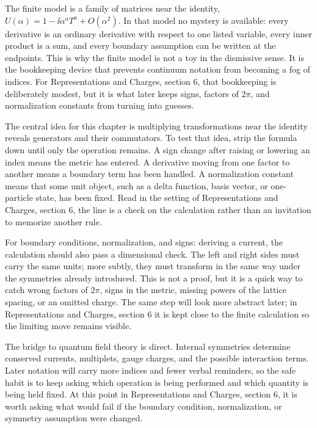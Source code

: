 The finite model is a family of matrices near the identity, \(U(\alpha)=1-\ii\alpha^aT^a+O(\alpha^2)\).  In that model no mystery is available: every derivative is an ordinary derivative with respect to one listed variable, every inner product is a sum, and every boundary assumption can be written at the endpoints.  This is why the finite model is not a toy in the dismissive sense.  It is the bookkeeping device that prevents continuum notation from becoming a fog of indices.  For Representations and Charges, section 6, that bookkeeping is deliberately modest, but it is what later keeps signs, factors of \(2\pi\), and normalization constants from turning into guesses.

The central idea for this chapter is multiplying transformations near the identity reveals generators and their commutators.  To test that idea, strip the formula down until only the operation remains.  A sign change after raising or lowering an index means the metric has entered.  A derivative moving from one factor to another means a boundary term has been handled.  A normalization constant means that some unit object, such as a delta function, basis vector, or one-particle state, has been fixed.  Read in the setting of Representations and Charges, section 6, the line is a check on the calculation rather than an invitation to memorize another rule.

For boundary conditions, normalization, and signs: deriving a current, the calculation should also pass a dimensional check.  The left and right sides must carry the same units; more subtly, they must transform in the same way under the symmetries already introduced.  This is not a proof, but it is a quick way to catch wrong factors of \(2\pi\), signs in the metric, missing powers of the lattice spacing, or an omitted charge.  The same step will look more abstract later; in Representations and Charges, section 6 it is kept close to the finite calculation so the limiting move remains visible.

The bridge to quantum field theory is direct.  Internal symmetries determine conserved currents, multiplets, gauge charges, and the possible interaction terms.  Later notation will carry more indices and fewer verbal reminders, so the safe habit is to keep asking which operation is being performed and which quantity is being held fixed.  At this point in Representations and Charges, section 6, it is worth asking what would fail if the boundary condition, normalization, or symmetry assumption were changed.

